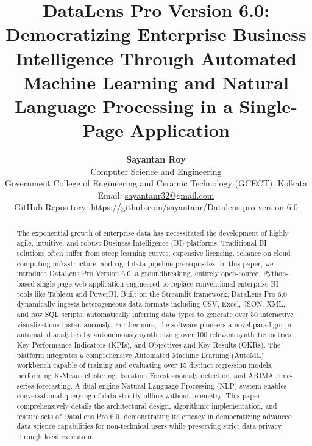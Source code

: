 \documentclass[12pt, a4paper]{article}
\title{\textbf{DataLens Pro Version 6.0: Democratizing Enterprise Business Intelligence Through Automated Machine Learning and Natural Language Processing in a Single-Page Application}}
\author{
    \textbf{Sayantan Roy} \\
    Computer Science and Engineering \\
    Government College of Engineering and Ceramic Technology (GCECT), Kolkata \\
    Email: \href{mailto:sayantanr32@gmail.com}{sayantanr32@gmail.com} \\
    GitHub Repository: \url{https://github.com/sayantanr/Datalens-pro-version-6.0}
}
\date{}
\begin{document}
\maketitle
\thispagestyle{empty}
\begin{abstract}
The exponential growth of enterprise data has necessitated the development of highly agile, intuitive, and robust Business Intelligence (BI) platforms. Traditional BI solutions often suffer from steep learning curves, expensive licensing, reliance on cloud computing infrastructure, and rigid data pipeline prerequisites. In this paper, we introduce DataLens Pro Version 6.0, a groundbreaking, entirely open-source, Python-based single-page web application engineered to replace conventional enterprise BI tools like Tableau and PowerBI. Built on the Streamlit framework, DataLens Pro 6.0 dynamically ingests heterogeneous data formats including CSV, Excel, JSON, XML, and raw SQL scripts, automatically inferring data types to generate over 50 interactive visualizations instantaneously. Furthermore, the software pioneers a novel paradigm in automated analytics by autonomously synthesizing over 100 relevant synthetic metrics, Key Performance Indicators (KPIs), and Objectives and Key Results (OKRs). The platform integrates a comprehensive Automated Machine Learning (AutoML) workbench capable of training and evaluating over 15 distinct regression models, performing K-Means clustering, Isolation Forest anomaly detection, and ARIMA time-series forecasting. A dual-engine Natural Language Processing (NLP) system enables conversational querying of data strictly offline without telemetry. This paper comprehensively details the architectural design, algorithmic implementation, and feature sets of DataLens Pro 6.0, demonstrating its efficacy in democratizing advanced data science capabilities for non-technical users while preserving strict data privacy through local execution.
\end{abstract}
\newpage
\end{document}
